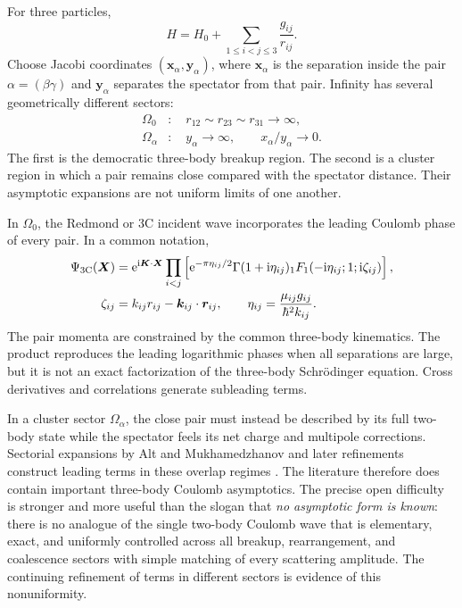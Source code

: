 For three particles,
\begin{equation}
  H=H_0+\sum_{1\leq i<j\leq3}\frac{g_{ij}}{r_{ij}} .
  \label{eq:three-body-coulomb-H}
\end{equation}
Choose Jacobi coordinates $(\bm x_\alpha,\bm y_\alpha)$, where
$\bm x_\alpha$ is the separation inside the pair
$\alpha=(\beta\gamma)$ and $\bm y_\alpha$ separates the spectator from that
pair.  Infinity has several geometrically different sectors:
\begin{align}
  \Omega_0&:\quad
  r_{12}\sim r_{23}\sim r_{31}\to\infty,
  \label{eq:three-body-breakup-sector}\\
  \Omega_\alpha&:\quad
  y_\alpha\to\infty,
  \qquad x_\alpha/y_\alpha\to0 .
  \label{eq:three-body-cluster-sector}
\end{align}
The first is the democratic three-body breakup region.  The second is a
cluster region in which a pair remains close compared with the spectator
distance.  Their asymptotic expansions are not uniform limits of one another.

In $\Omega_0$, the Redmond or 3C incident wave incorporates the leading
Coulomb phase of every pair.  In a common notation,
\begin{align}
  \Psi_{\mathrm{3C}}(\bm X)
  &=
  \mathrm{e}^{\mathrm{i}\bm K\cdot\bm X}
  \prod_{i<j}
  \left[
  \mathrm{e}^{-\pi\eta_{ij}/2}\Gamma(1+\mathrm{i}\eta_{ij})
  {}_1F_1(-\mathrm{i}\eta_{ij};1;\mathrm{i}\zeta_{ij})
  \right],
  \label{eq:three-C-wave}\\
  \zeta_{ij}
  &=k_{ij}r_{ij}-\bm k_{ij}\cdot\bm r_{ij},
  \qquad
  \eta_{ij}=\frac{\mu_{ij}g_{ij}}{\hbar^2k_{ij}} .
  \label{eq:three-C-variables}
\end{align}
The pair momenta are constrained by the common three-body kinematics.  The
product reproduces the leading logarithmic phases when all separations are
large, but it is not an exact factorization of the three-body Schr\"odinger
equation.  Cross derivatives and correlations generate subleading terms.

In a cluster sector $\Omega_\alpha$, the close pair must instead be described
by its full two-body state while the spectator feels its net charge and
multipole corrections.  Sectorial expansions by Alt and Mukhamedzhanov and
later refinements construct leading terms in these overlap regimes
\cite{AltMukhamedzhanov:1993,MukhamedzhanovLieber:1996,
Kadyrov:2003ThreeBody,Mukhamedzhanov:2006Leading,Yakovlev:2022Coulomb}.
The literature therefore does contain important three-body Coulomb
asymptotics.  The precise open difficulty is stronger and more useful than
the slogan that \textit{no asymptotic form is known}: there is no analogue of
the single two-body Coulomb wave that is elementary, exact, and uniformly
controlled across all breakup, rearrangement, and coalescence sectors with
simple matching of every scattering amplitude.  The continuing refinement of
terms in different sectors is evidence of this nonuniformity.

